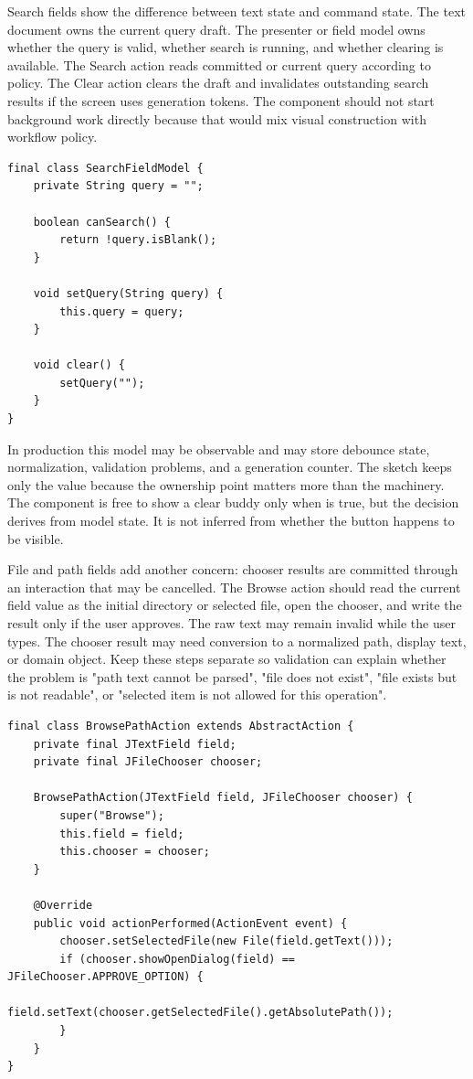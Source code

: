 Search fields show the difference between text state and command state. The text
document owns the current query draft. The presenter or field model owns whether the
query is valid, whether search is running, and whether clearing is available. The Search
action reads committed or current query according to policy. The Clear action clears the
draft and invalidates outstanding search results if the screen uses generation tokens.
The component should not start background work directly because that would mix visual
construction with workflow policy.

\begin{lstlisting}[caption={Search and clear actions share one field model.}]
final class SearchFieldModel {
    private String query = "";

    boolean canSearch() {
        return !query.isBlank();
    }

    void setQuery(String query) {
        this.query = query;
    }

    void clear() {
        setQuery("");
    }
}
\end{lstlisting}

In production this model may be observable and may store debounce state, normalization,
validation problems, and a generation counter. The sketch keeps only the value because
the ownership point matters more than the machinery. The component is free to show a
clear buddy only when  is true, but the decision derives from model
state. It is not inferred from whether the button happens to be visible.

File and path fields add another concern: chooser results are committed through an
interaction that may be cancelled. The Browse action should read the current field value
as the initial directory or selected file, open the chooser, and write the result only
if the user approves. The raw text may remain invalid while the user types. The chooser
result may need conversion to a normalized path, display text, or domain object. Keep
these steps separate so validation can explain whether the problem is "path text cannot
be parsed", "file does not exist", "file exists but is not readable", or "selected item
is not allowed for this operation".

\begin{lstlisting}[caption={A browse action commits only an approved chooser result.}]
final class BrowsePathAction extends AbstractAction {
    private final JTextField field;
    private final JFileChooser chooser;

    BrowsePathAction(JTextField field, JFileChooser chooser) {
        super("Browse");
        this.field = field;
        this.chooser = chooser;
    }

    @Override
    public void actionPerformed(ActionEvent event) {
        chooser.setSelectedFile(new File(field.getText()));
        if (chooser.showOpenDialog(field) == JFileChooser.APPROVE_OPTION) {
            field.setText(chooser.getSelectedFile().getAbsolutePath());
        }
    }
}
\end{lstlisting}

